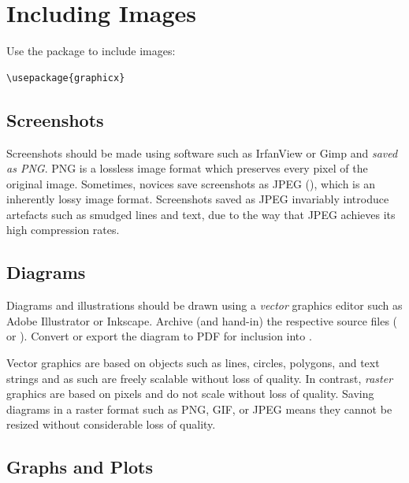 \section{Including Images}

Use the  package to include images:
\begin{samepage}
\begin{lstlisting}
\usepackage{graphicx}
\end{lstlisting}
\end{samepage}



\subsection{Screenshots}

Screenshots should be made using software such as IrfanView or Gimp
and \emph{saved as PNG}. PNG is a lossless image format which
preserves every pixel of the original image. Sometimes, novices save
screenshots as JPEG (), which is an inherently lossy image
format. Screenshots saved as JPEG invariably introduce artefacts such
as smudged lines and text, due to the way that JPEG achieves its high
compression rates.




\subsection{Diagrams}

Diagrams and illustrations should be drawn using a \emph{vector}
graphics editor such as Adobe Illustrator or
Inkscape\citep{Inkscape}. Archive (and hand-in) the respective source
files ( or ). Convert or export the diagram to
PDF for inclusion into \LaTeXe.

Vector graphics are based on objects such as lines, circles, polygons,
and text strings and as such are freely scalable without loss of
quality. In contrast, \emph{raster} graphics are based on pixels and
do not scale without loss of quality. Saving diagrams in a raster
format such as PNG, GIF, or JPEG means they cannot be resized without
considerable loss of quality.





\subsection{Graphs and Plots}

